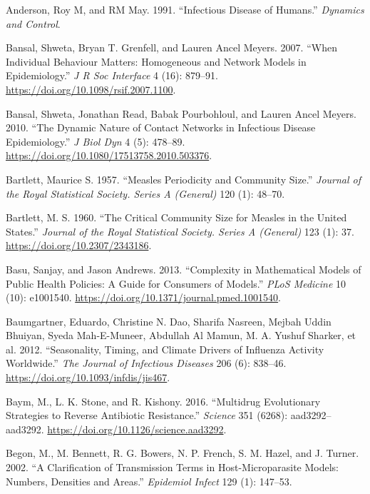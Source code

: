 \documentclass[
]{book}
\begin{document}
\leavevmode\hypertarget{ref-anderson91}{}%
Anderson, Roy M, and RM May. 1991. ``Infectious Disease of Humans.'' \emph{Dynamics and Control}.

\leavevmode\hypertarget{ref-bansal07}{}%
Bansal, Shweta, Bryan T. Grenfell, and Lauren Ancel Meyers. 2007. ``When Individual Behaviour Matters: Homogeneous and Network Models in Epidemiology.'' \emph{J R Soc Interface} 4 (16): 879--91. \url{https://doi.org/10.1098/rsif.2007.1100}.

\leavevmode\hypertarget{ref-bansal10}{}%
Bansal, Shweta, Jonathan Read, Babak Pourbohloul, and Lauren Ancel Meyers. 2010. ``The Dynamic Nature of Contact Networks in Infectious Disease Epidemiology.'' \emph{J Biol Dyn} 4 (5): 478--89. \url{https://doi.org/10.1080/17513758.2010.503376}.

\leavevmode\hypertarget{ref-bartlett57}{}%
Bartlett, Maurice S. 1957. ``Measles Periodicity and Community Size.'' \emph{Journal of the Royal Statistical Society. Series A (General)} 120 (1): 48--70.

\leavevmode\hypertarget{ref-bartlett60}{}%
Bartlett, M. S. 1960. ``The Critical Community Size for Measles in the United States.'' \emph{Journal of the Royal Statistical Society. Series A (General)} 123 (1): 37. \url{https://doi.org/10.2307/2343186}.

\leavevmode\hypertarget{ref-basu13}{}%
Basu, Sanjay, and Jason Andrews. 2013. ``Complexity in Mathematical Models of Public Health Policies: A Guide for Consumers of Models.'' \emph{PLoS Medicine} 10 (10): e1001540. \url{https://doi.org/10.1371/journal.pmed.1001540}.

\leavevmode\hypertarget{ref-baumgartner12}{}%
Baumgartner, Eduardo, Christine N. Dao, Sharifa Nasreen, Mejbah Uddin Bhuiyan, Syeda Mah-E-Muneer, Abdullah Al Mamun, M. A. Yushuf Sharker, et al. 2012. ``Seasonality, Timing, and Climate Drivers of Influenza Activity Worldwide.'' \emph{The Journal of Infectious Diseases} 206 (6): 838--46. \url{https://doi.org/10.1093/infdis/jis467}.

\leavevmode\hypertarget{ref-baym16}{}%
Baym, M., L. K. Stone, and R. Kishony. 2016. ``Multidrug Evolutionary Strategies to Reverse Antibiotic Resistance.'' \emph{Science} 351 (6268): aad3292--aad3292. \url{https://doi.org/10.1126/science.aad3292}.

\leavevmode\hypertarget{ref-begon02}{}%
Begon, M., M. Bennett, R. G. Bowers, N. P. French, S. M. Hazel, and J. Turner. 2002. ``A Clarification of Transmission Terms in Host-Microparasite Models: Numbers, Densities and Areas.'' \emph{Epidemiol Infect} 129 (1): 147--53.
\end{document}
